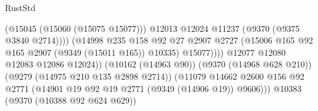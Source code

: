 \begin{lexlean}{RustStd}
\begin{coremodule}
{\begin{coremodule}
{{{{{{{{{{{{{{{{{{{{{{{{{{{{{{{{{{{{{{{                                                          (@15045 (@15060 (@15075 @15077)))
                                                          @12013
                                                          @12024
                                                          @11237
                                                          (@9370 (@9375 @3840 @2714))))
                                                      (@14998
                                                        @235
                                                        @158
                                                        @92
                                                        @27
                                                        @2907
                                                        @2727
                                                        (@15006
                                                          @165
                                                          @92
                                                          @165
                                                          @2907
                                                          (@9349 (@15011 @165))
                                                          @10335)
                                                        @15077))))
                                                @12077
                                                @12080
                                                @12083
                                                @12086
                                                @12024))
                                            (@10162 (@14963 @90))
                                            (@9370 (@14968 @628 @210))
                                            (@9279 (@14975 @210 @135 @2898 @2714))
                                            (@11079
                                              @14662
                                              @2600
                                              @156
                                              @92
                                              @2771
                                              (@14901
                                                @19
                                                @92
                                                @19
                                                @2771
                                                (@9349 (@14906 @19))
                                                @9606)))
                                          @10383
                                          (@9370 (@10388 @92 @624 @629))
}}}}}}}}}}}}}}}}}}}}}}}}}}}}}}}}}}}}}}}
\end{coremodule}}
\end{coremodule}
\end{lexlean}
